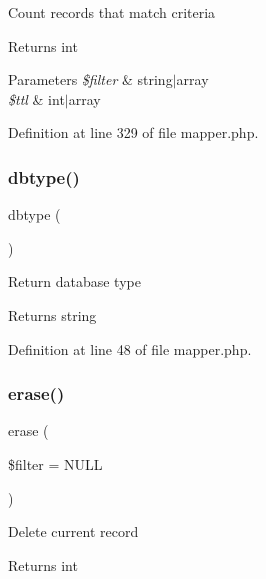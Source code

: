 Count records that match criteria \begin{DoxyReturn}{Returns}
int 
\end{DoxyReturn}

\begin{DoxyParams}{Parameters}
{\em \$filter} & string$\vert$array \\
\hline
{\em \$ttl} & int$\vert$array \\
\hline
\end{DoxyParams}


Definition at line 329 of file mapper.\+php.

\hypertarget{class_d_b_1_1_s_q_l_1_1_mapper_a38948c2fb1711f49b72f123cbd91e611}{}\label{class_d_b_1_1_s_q_l_1_1_mapper_a38948c2fb1711f49b72f123cbd91e611} 
\subsubsection{\texorpdfstring{dbtype()}{dbtype()}}
{\footnotesize\ttfamily dbtype (\begin{DoxyParamCaption}{ }\end{DoxyParamCaption})}

Return database type \begin{DoxyReturn}{Returns}
string 
\end{DoxyReturn}


Definition at line 48 of file mapper.\+php.

\hypertarget{class_d_b_1_1_s_q_l_1_1_mapper_aa7210074cfc1eda78dc492d8b8a96616}{}\label{class_d_b_1_1_s_q_l_1_1_mapper_aa7210074cfc1eda78dc492d8b8a96616} 
\subsubsection{\texorpdfstring{erase()}{erase()}}
{\footnotesize\ttfamily erase (\begin{DoxyParamCaption}\item[{}]{\$filter = {\ttfamily NULL} }\end{DoxyParamCaption})}

Delete current record \begin{DoxyReturn}{Returns}
int 
\end{DoxyReturn}

